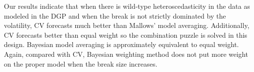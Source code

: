 Our results indicate that when there is wild-type heteroscedasticity in the data as modeled in the DGP and when the break is not strictly dominated by the volatility, CV forecasts much better than Mallows' model averaging. Additionally, CV forecasts better than equal weight so the combination puzzle is solved in this design. Bayesian model averaging is approximately equivalent to equal weight. Again, compared with CV, Bayesian weighting method does not put more weight on the proper model when the break size increases.

